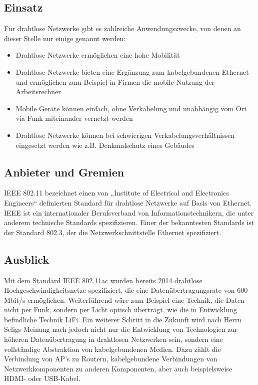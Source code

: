 \begin{multicols}{3}

\subsection*{Einsatz}
Für drahtlose Netzwerke gibt es zahlreiche Anwendungszwecke, von denen an dieser Stelle nur einige genannt werden:
\begin{itemize}
	\item Drahtlose Netzwerke ermöglichen eine hohe Mobilität
	\item Drahtlose Netzwerke bieten  eine Ergänzung zum 				kabelgebundenen Ethernet und ermöglichen zum Beispiel in Firmen  die mobile Nutzung der Arbeitsrechner
	\item Mobile Geräte können einfach, ohne Verkabelung und unabhängig vom Ort via Funk miteinander vernetzt werden
	\item Drahtlose Netzwerke können bei schwierigen Verkabelungsverhältnissen eingesetzt werden wie z.B. Denkmalschutz eines Gebäudes~\cite{basics.8}
\end{itemize}

\subsection*{Anbieter und Gremien}
IEEE 802.11 bezeichnet einen von „Institute of Electrical and Electronics Engineers“ definierten Standard für drahtlose Netzwerke auf Basis von Ethernet. IEEE ist ein internationaler Berufsverband von Informationstechnikern, die unter anderem technische Standards spezifizieren. Einer der bekanntesten Standards ist der Standard 802.3, der die Netzwerkschnittstelle Ethernet spezifiziert.

\subsection*{Ausblick}
Mit dem Standard IEEE 802.11ac wurden bereits 2014 drahtlose Hochgeschwindigkeitsnetze spezifiziert, die eine Datenübertragungsrate von 600 Mbit/s ermöglichen. Weiterführend wäre zum Beispiel eine Technik, die Daten nicht per Funk, sondern per Licht optisch überträgt, wie die in Entwicklung befindliche Technik LiFi.
Ein weiterer Schritt in die Zukunft wird nach Herrn Seligs Meinung  nach jedoch nicht nur die Entwicklung von Technologien zur höheren Datenübertragung in drahtlosen Netzwerken sein, sondern eine vollständige Abstraktion von kabelgebundenen Medien. Dazu zählt die Verbindung von AP's zu Routern, kabelgebundene Verbindungen von Netzwerkkomponenten zu anderen Komponenten, aber auch beispielsweise HDMI- oder USB-Kabel.


\end{multicols}
